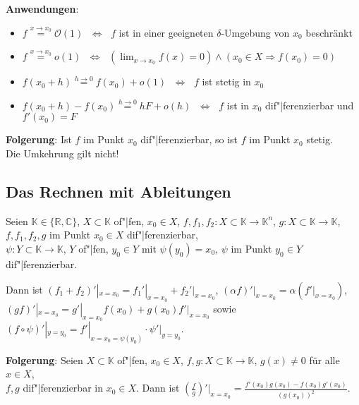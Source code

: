 \linie

\textbf{Anwendungen}:
\begin{itemize}
    \item $f \overset{x \to x_0}{=} \mathcal{O}(1)$
    $\;\Leftrightarrow\;$ $f$ ist in einer geeigneten $\delta$-Umgebung
    von $x_0$ beschränkt

    \item $f \overset{x \to x_0}{=} o(1)$
    $\;\Leftrightarrow\;$ $(\lim_{x \to x_0} f(x) = 0) \land
    (x_0 \in X \Rightarrow f(x_0) = 0)$

    \item $f(x_0 + h) \overset{h \to 0}{=} f(x_0) + o(1)$
    $\;\Leftrightarrow\;$ $f$ ist stetig in $x_0$

    \item $f(x_0 + h) - f(x_0) \overset{h \to 0}{=} hF + o(h)$
    $\;\Leftrightarrow\;$ $f$ ist in $x_0$ dif"|ferenzierbar und $f'(x_0) = F$
\end{itemize}

\textbf{Folgerung}:
Ist $f$ im Punkt $x_0$ dif"|ferenzierbar, so ist $f$ im Punkt $x_0$ stetig. \\
Die Umkehrung gilt nicht!

\subsection{%
    Das Rechnen mit Ableitungen%
}

Seien $\mathbb{K} \in \{\mathbb{R}, \mathbb{C}\}$, $X \subset \mathbb{K}$
of"|fen, $x_0 \in X$, \quad
$f, f_1, f_2: X \subset \mathbb{K} \rightarrow \mathbb{K}^n$,
$g: X \subset \mathbb{K} \rightarrow \mathbb{K}$, \\
$f, f_1, f_2, g$ im Punkt $x_0 \in X$ dif"|ferenzierbar, \\
$\psi: Y \subset \mathbb{K} \rightarrow \mathbb{K}$, $Y$ of"|fen, $y_0 \in Y$
mit $\psi(y_0) = x_0$, $\psi$ im Punkt $y_0 \in Y$ dif"|ferenzierbar.

Dann ist $(f_1 + f_2)'|_{x=x_0} = f_1'|_{x=x_0} + f_2'|_{x=x_0}$, \quad
$(\alpha f)'|_{x=x_0} = \alpha (f'|_{x=x_0})$, \\
$(gf)'|_{x=x_0} = g'|_{x=x_0} f(x_0) + g(x_0) f'|_{x=x_0}$ \quad sowie \quad
$(f \circ \psi)'|_{y=y_0} = f'|_{x=x_0=\psi(y_0)} \cdot \psi'|_{y=y_0}$.

\textbf{Folgerung}: Seien $X \subset \mathbb{K}$ of"|fen, $x_0 \in X$,
$f, g: X \subset \mathbb{K} \rightarrow \mathbb{K}$, $g(x) \not= 0$ für
alle $x \in X$, \\
$f, g$ dif"|ferenzierbar in $x_0 \in X$. \quad
Dann ist {\large $\left(\frac{f}{g}\right)'\Big|_{x=x_0} =
\frac{f'(x_0) g(x_0) - f(x_0) g'(x_0)}{(g(x_0))^2}$}.

